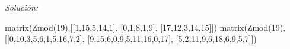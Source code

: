 \documentclass[12pt]{amsart}
\begin{document}
{\it Soluci\'on:}

\begin{sageblock}
matrix(Zmod(19),[[1,15,5,14,1],
[0,1,8,1,9],
[17,12,3,14,15]])
matrix(Zmod(19),[[0,10,3,5,6,1,5,16,7,2],
[9,15,6,0,9,5,11,16,0,17],
[5,2,11,9,6,18,6,9,5,7]])
\end{sageblock}

\end{document}
